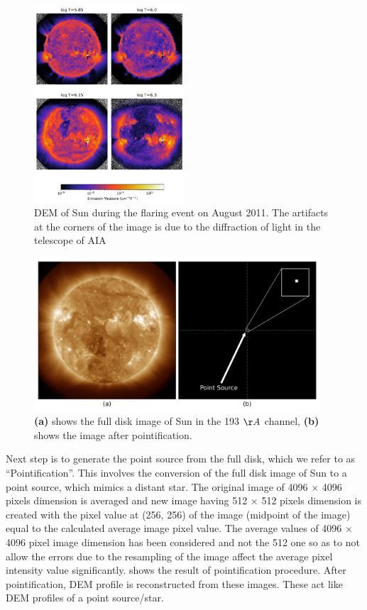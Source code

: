 \begin{figure}[h!]
    \centering
    \includegraphics[width=0.5\textwidth]{images/dem_img_aug_4_2011.png}
    \caption[DEM image of Sun]{DEM of Sun during the flaring event on  August 2011. The artifacts at the corners of the image is due to the diffraction of light in the telescope of AIA}
    \label{fig:dem_img_aug_4_2011}
\end{figure}

\begin{figure}[h!]
    \centering
    \includegraphics[width=0.95\textwidth]{images/ps_plus_full_disk.png}
    \caption[Full Disk and Pointified Image of Sun]{\textbf{(a)} shows the full disk image of Sun in the 193 $\AA$ channel, \textbf{(b)} shows the image after pointification.}
    \label{fig:ps_plus_full_disk}
\end{figure}

Next step is to generate the point source from the full disk, which we refer to as ``Pointification''. This involves the conversion of the full disk image of Sun to a point source, which mimics a distant star. The original image of 4096 $\times$ 4096 pixels dimension is averaged and new image having 512 $\times$ 512 pixels dimension is created with the pixel value at (256, 256) of the image (midpoint of the image) equal to the calculated average image pixel value. The average values of 4096 $\times$ 4096 pixel image dimension has been considered and not the 512 one so as to not allow the errors due to the resampling of the image affect the average pixel intensity value significantly.  shows the result of pointification procedure. After pointification, DEM profile is reconstructed from these images. These act like DEM profiles of a point source/star.\\

